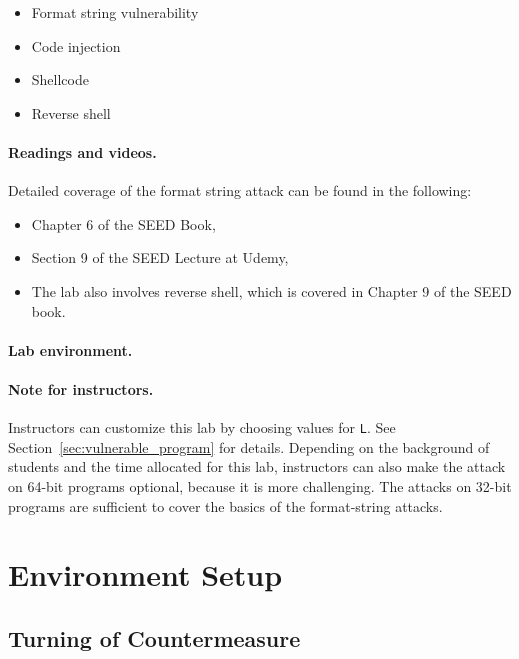 \begin{itemize}[noitemsep]
\item Format string vulnerability
\item Code injection
\item Shellcode 
\item Reverse shell 
\end{itemize}


\paragraph{Readings and videos.}
Detailed coverage of the format string attack can be found in the following:

\begin{itemize}
\item Chapter 6 of the SEED Book, \seedbook
\item Section 9 of the SEED Lecture at Udemy, \seedcsvideo
\item The lab also involves reverse shell, which is covered in Chapter 9 of the SEED book.
\end{itemize}


\paragraph{Lab environment.} \seedenvironmentC

\paragraph{Note for instructors.}
Instructors can customize this lab by choosing values
for \texttt{L}. See Section~\ref{sec:vulnerable_program} for details.
Depending on the background of students and the time allocated
for this lab, instructors can also make the
attack on 64-bit programs optional, because it is 
more challenging. The attacks on 32-bit programs are sufficient
to cover the basics of the format-string attacks.

\section{Environment Setup} 


\subsection{Turning of Countermeasure} 

